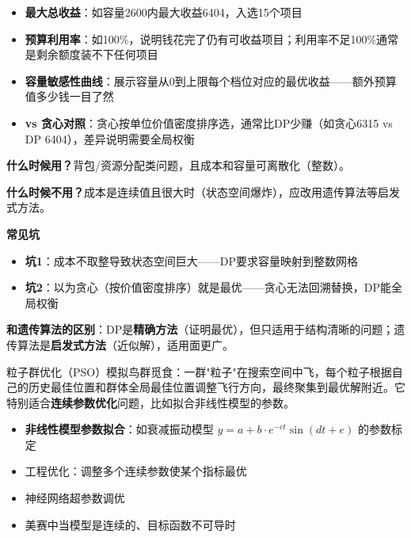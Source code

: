 \begin{algoresult}
\begin{itemize}
    \item \textbf{最大总收益}：如容量2600内最大收益6404，入选15个项目
    \item \textbf{预算利用率}：如100\%，说明钱花完了仍有可收益项目；利用率不足100\%通常是剩余额度装不下任何项目
    \item \textbf{容量敏感性曲线}：展示容量从0到上限每个档位对应的最优收益——额外预算值多少钱一目了然
    \item \textbf{vs 贪心对照}：贪心按单位价值密度排序选，通常比DP少赚（如贪心6315 vs DP 6404），差异说明需要全局权衡
\end{itemize}
\end{algoresult}

\begin{algonotes}
\textbf{什么时候用？}背包/资源分配类问题，且成本和容量可离散化（整数）。

\textbf{什么时候不用？}成本是连续值且很大时（状态空间爆炸），应改用遗传算法等启发式方法。

\textbf{常见坑}
\begin{itemize}
    \item \textbf{坑1}：成本不取整导致状态空间巨大——DP要求容量映射到整数网格
    \item \textbf{坑2}：以为贪心（按价值密度排序）就是最优——贪心无法回溯替换，DP能全局权衡
\end{itemize}

\textbf{和遗传算法的区别}：DP是\textbf{精确方法}（证明最优），但只适用于结构清晰的问题；遗传算法是\textbf{启发式方法}（近似解），适用面更广。
\end{algonotes}


\begin{algointro}
粒子群优化（PSO）模拟鸟群觅食：一群"粒子"在搜索空间中飞，每个粒子根据自己的历史最佳位置和群体全局最佳位置调整飞行方向，最终聚集到最优解附近。它特别适合\textbf{连续参数优化}问题，比如拟合非线性模型的参数。
\end{algointro}

\begin{algoscene}
\begin{itemize}
    \item \textbf{非线性模型参数拟合}：如衰减振动模型 $y=a+b\cdot e^{-ct}\sin(dt+e)$ 的参数标定
    \item 工程优化：调整多个连续参数使某个指标最优
    \item 神经网络超参数调优
    \item 美赛中当模型是连续的、目标函数不可导时
\end{itemize}
\end{algoscene}

